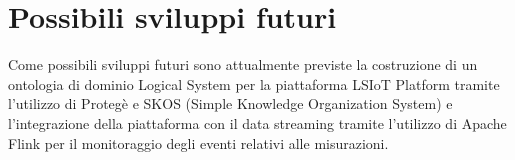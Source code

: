 \section{Possibili sviluppi futuri}
Come possibili sviluppi futuri sono attualmente previste la costruzione di un ontologia di dominio Logical System per la piattaforma LSIoT Platform tramite l'utilizzo di Protegè e SKOS (Simple Knowledge Organization System) e l'integrazione della piattaforma con il data streaming tramite l'utilizzo di Apache Flink per il monitoraggio degli eventi relativi alle misurazioni.
